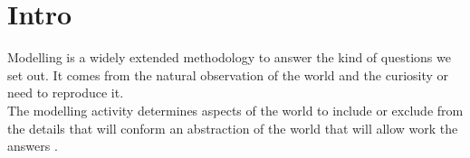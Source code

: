 \documentclass[11pt,oneside,a4paper,openright]{report}
\begin{document}
\section{Intro}





Modelling is a widely extended methodology to answer the kind of questions we set out. It comes from the natural observation of the world and the curiosity or need to reproduce it.\\
The modelling activity determines aspects of the world to include or exclude from the details that
will conform an abstraction of the world that will allow work the answers \cite{Robinson2008}.





\end{document}
